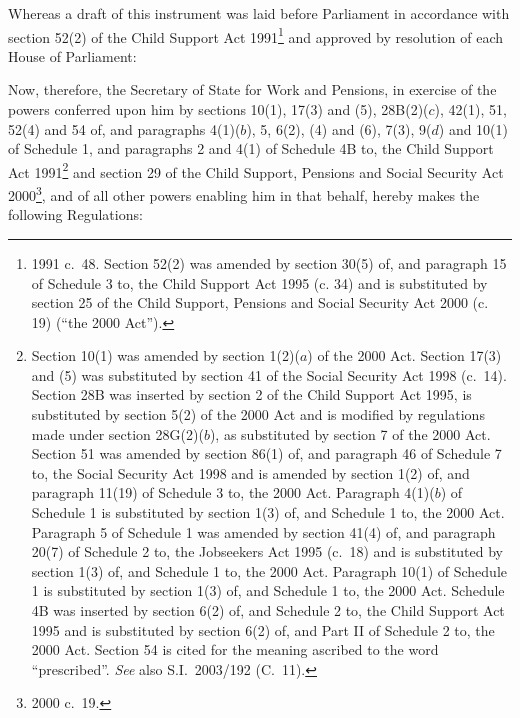 \documentclass[12pt,a4paper]{article}
\title{\regstitle}
\author{S.I.\ 2005 No.\ 785}
\date{Made
15th March 2005\\
Coming into force
in accordance with regulation 1(2)
}
\begin{document}
\maketitle

\noindent
Whereas a draft of this instrument was laid before Parliament in accordance with section 52(2) of the Child Support Act 1991\footnote{1991 c.\ 48. Section 52(2) was amended by section 30(5) of, and paragraph 15 of Schedule 3 to, the Child Support Act 1995 (c. 34) and is substituted by section 25 of the Child Support, Pensions and Social Security Act 2000 (c. 19) (“the 2000 Act”).} and approved by resolution of each House of Parliament:

Now, therefore, the Secretary of State for Work and Pensions, in exercise of the powers conferred upon him by sections 10(1), 17(3) and (5), 28B(2)($c$), 42(1), 51, 52(4) and 54 of, and paragraphs 4(1)($b$), 5, 6(2), (4) and (6), 7(3), 9($d$)  and 10(1) of Schedule 1, and paragraphs 2 and 4(1) of Schedule 4B to, the Child Support Act 1991\footnote{Section 10(1) was amended by section 1(2)($a$) of the 2000 Act. Section 17(3) and (5) was substituted by section 41 of the Social Security Act 1998 (c.\ 14). Section 28B was inserted by section 2 of the Child Support Act 1995, is substituted by section 5(2) of the 2000 Act and is modified by regulations made under section 28G(2)($b$), as substituted by section 7 of the 2000 Act. Section 51 was amended by section 86(1) of, and paragraph 46 of Schedule 7 to, the Social Security Act 1998 and is amended by section 1(2) of, and paragraph 11(19) of Schedule 3 to, the 2000 Act. Paragraph 4(1)($b$) of Schedule 1 is substituted by section 1(3) of, and Schedule 1 to, the 2000 Act. Paragraph 5 of Schedule 1 was amended by section 41(4) of, and paragraph 20(7) of Schedule 2 to, the Jobseekers Act 1995 (c.\ 18) and is substituted by section 1(3) of, and Schedule 1 to, the 2000 Act. Paragraph 10(1) of Schedule 1 is substituted by section 1(3) of, and Schedule 1 to, the 2000 Act. Schedule 4B was inserted by section 6(2) of, and Schedule 2 to, the Child Support Act 1995 and is substituted by section 6(2) of, and Part II of Schedule 2 to, the 2000 Act. Section 54 is cited for the meaning ascribed to the word “prescribed”. \emph{See} also S.I.\ 2003/192 (C.\ 11).} and section 29 of the Child Support, Pensions and Social Security Act 2000\footnote{2000 c.\ 19.}, and of all other powers enabling him in that behalf, hereby makes the following Regulations:  

{\sloppy

\tableofcontents

}
\end{document}
